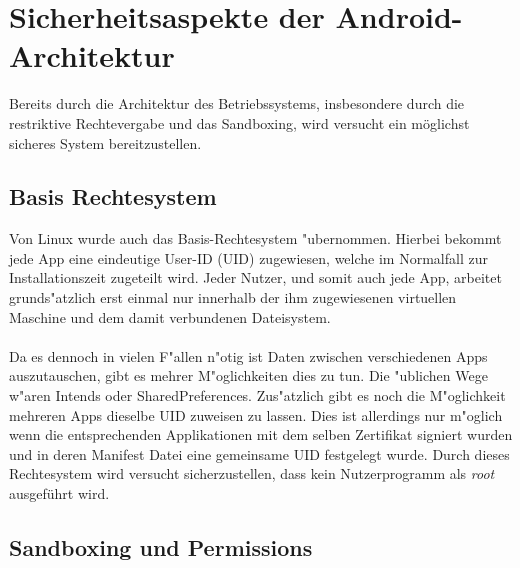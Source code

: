 \section{Sicherheitsaspekte der Android-Architektur}

	Bereits durch die Architektur des Betriebssystems, insbesondere durch die restriktive Rechtevergabe und das Sandboxing, wird versucht ein möglichst sicheres System bereitzustellen.

	\subsection{Basis Rechtesystem}\label{sec:BasisRechteSystem}
	Von Linux wurde auch das Basis-Rechtesystem "ubernommen. Hierbei bekommt jede App eine eindeutige User-ID (UID) zugewiesen, welche im Normalfall zur Installationszeit zugeteilt wird. Jeder Nutzer, und somit auch jede App, arbeitet grunds"atzlich erst einmal nur innerhalb der ihm zugewiesenen virtuellen Maschine und dem damit verbundenen Dateisystem.\\\\
	Da es dennoch in vielen F"allen n"otig ist Daten zwischen verschiedenen Apps auszutauschen, gibt es mehrer M"oglichkeiten dies zu tun. Die "ublichen Wege w"aren Intends oder SharedPreferences. Zus"atzlich gibt es noch die M"oglichkeit mehreren Apps dieselbe UID zuweisen zu lassen. Dies ist allerdings nur m"oglich wenn die entsprechenden Applikationen mit dem selben Zertifikat signiert wurden und in deren Manifest Datei eine gemeinsame UID festgelegt wurde.
	Durch dieses Rechtesystem wird versucht sicherzustellen, dass kein Nutzerprogramm als \textit{root} ausgeführt wird.
	
	\subsection{Sandboxing und Permissions} \label{sec:SandBoxingNPermissions}